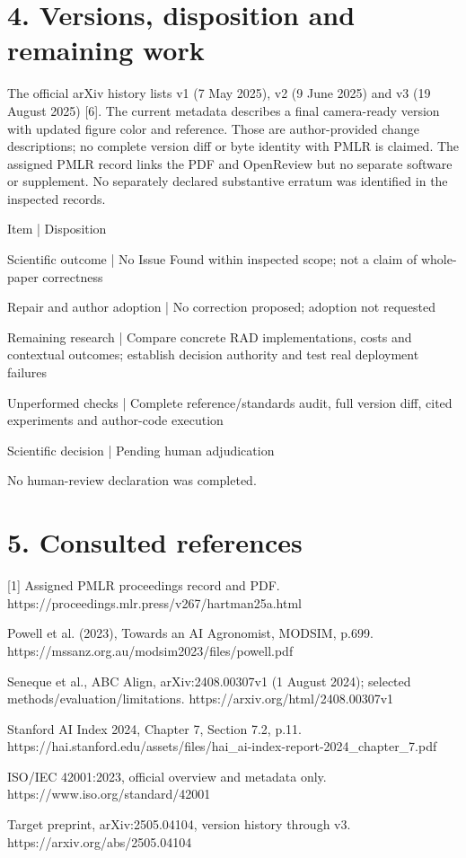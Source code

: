 \documentclass[10pt]{article}
\begin{document}
\section*{4. Versions, disposition and remaining work}
The official arXiv history lists v1 (7 May 2025), v2 (9 June 2025) and v3 (19 August 2025) [6]. The current metadata describes a final camera-ready version with updated figure color and reference. Those are author-provided change descriptions; no complete version diff or byte identity with PMLR is claimed. The assigned PMLR record links the PDF and OpenReview but no separate software or supplement. No separately declared substantive erratum was identified in the inspected records.\par
Item | Disposition\par
Scientific outcome | No Issue Found within inspected scope; not a claim of whole-paper correctness\par
Repair and author adoption | No correction proposed; adoption not requested\par
Remaining research | Compare concrete RAD implementations, costs and contextual outcomes; establish decision authority and test real deployment failures\par
Unperformed checks | Complete reference/standards audit, full version diff, cited experiments and author-code execution\par
Scientific decision | Pending human adjudication\par
No human-review declaration was completed.\par
\section*{5. Consulted references}
[1] Assigned PMLR proceedings record and PDF. https://proceedings.mlr.press/v267/hartman25a.html\par
Powell et al. (2023), Towards an AI Agronomist, MODSIM, p.699. https://mssanz.org.au/modsim2023/files/powell.pdf\par
Seneque et al., ABC Align, arXiv:2408.00307v1 (1 August 2024); selected methods/evaluation/limitations. https://arxiv.org/html/2408.00307v1\par
Stanford AI Index 2024, Chapter 7, Section 7.2, p.11. https://hai.stanford.edu/assets/files/hai\_ai-index-report-2024\_chapter\_7.pdf\par
ISO/IEC 42001:2023, official overview and metadata only. https://www.iso.org/standard/42001\par
Target preprint, arXiv:2505.04104, version history through v3. https://arxiv.org/abs/2505.04104\par
\end{document}
